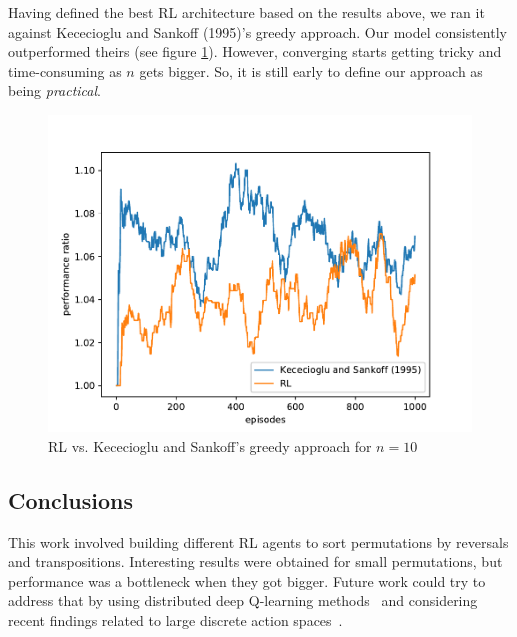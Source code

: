 \documentclass[11pt,twoside]{article}
\begin{document}
Having defined the best RL architecture based on the results above, we ran it against Kececioglu and Sankoff (1995)'s greedy approach. Our model consistently outperformed theirs (see figure \ref{chart:rl_greedy}). However, converging starts getting tricky and time-consuming as $n$ gets bigger. So, it is still early to define our approach as being \textit{practical}. 

\begin{figure}[H]
	\begin{center}
		\includegraphics[scale=0.8]{charts/rl_greedy_comp.pdf}
		\caption{RL vs. Kececioglu and Sankoff's greedy approach for $n = 10$}
		\label{chart:rl_greedy}
	\end{center}
\end{figure}

\subsection{Conclusions}

This work involved building different RL agents to sort permutations by reversals and transpositions. Interesting results were obtained for small permutations, but performance was a bottleneck when they got bigger. Future work could try to address that by using distributed deep Q-learning methods~\cite{dist_dqnn1, dist_dqnn2} and considering recent findings related to large discrete action spaces~\cite{large_space}.



\end{document}
